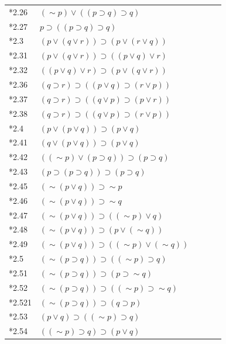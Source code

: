 \documentclass{IEEEcsmag}
\begin{document}
\begin{table}[h]
\begin{tabular}{lllll}
*2.26 & $ (\sim p) \vee ((p \supset q) \supset q) $ & \Y & \ & \Y \\
*2.27 & $p \supset ((p \supset q) \supset q) $ & \Y & \ & \Y \\
*2.3 & $(p \vee (q \vee r)) \supset (p \vee (r \vee q)) $ & \Y & \ & \Y \\
*2.31 & $(p \vee (q \vee r)) \supset ((p \vee q) \vee r) $ & \N & \N \cite[p.~220]{LT1957} & \N \\
*2.32 & $((p \vee q) \vee r) \supset (p \vee (q \vee r)) $ & \N & \ & \N \\
*2.36 & $(q \supset r) \supset ((p \vee q) \supset (r \vee p)) $ & \N & \ & \N \\
*2.37 & $(q \supset r) \supset ((q \vee p) \supset (p \vee r)) $ & \N & \ & \N \\
*2.38 & $(q \supset r) \supset ((q \vee p) \supset (r \vee p)) $ & \Y & \ & \N \\
*2.4 & $(p \vee (p \vee q)) \supset (p \vee q) $ & \N & \ & \N \\
*2.41 & $(q \vee (p \vee q)) \supset (p \vee q) $ & \N & \ & \N \\
*2.42 & $(( \sim p) \vee (p \supset q)) \supset (p \supset q) $ & \Y & \ & \N \\
*2.43 & $(p \supset (p \supset q)) \supset (p \supset q) $ & \Y & \ & \Y \\
*2.45 & $ (\sim (p \vee q)) \supset \sim p $ & \Y & \Y \cite[p.~219]{LT1957} & \Y \\
*2.46 & $ (\sim (p \vee q)) \supset \sim q $ & \Y & \ & \Y \\
*2.47 & $ (\sim (p \vee q)) \supset ( (\sim p) \vee q) $ & \Y & \ & \Y \\
*2.48 & $ (\sim (p \vee q)) \supset (p \vee (\sim q)) $ & \Y & \Y \cite[p.~229]{LT1957} & \Y \\
*2.49 & $ (\sim (p \vee q)) \supset ( (\sim p) \vee (\sim q)) $ & \Y & \ & \Y \\
*2.5 & $ (\sim (p \supset q)) \supset ( (\sim p) \supset q) $ & \Y & \ & \Y \\
*2.51 & $ (\sim (p \supset q)) \supset (p \supset \sim q) $ & \Y & \ & \Y \\
*2.52 & $ (\sim (p \supset q)) \supset ( (\sim p) \supset \sim q)$ & \Y & \ & \Y \\
*2.521 & $ (\sim (p \supset q)) \supset (q \supset p) $ & \Y & \ & \Y \\
*2.53 & $(p \vee q) \supset ( (\sim p) \supset q) $ & \Y & \ & \N \\
*2.54 & $( (\sim p )\supset q) \supset (p \vee q) $ & \Y & \ & \N \\

\end{tabular}
\end{table}
\end{document}

